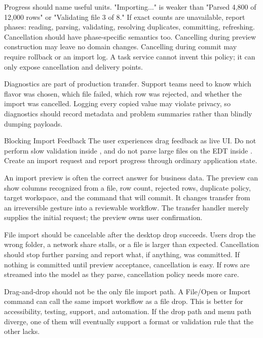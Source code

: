 Progress should name useful units. "Importing..." is weaker than "Parsed 4,800 of 12,000 rows" or "Validating file 3 of 8." If exact counts are unavailable, report phases: reading, parsing, validating, resolving duplicates, committing, refreshing. Cancellation should have phase-specific semantics too. Cancelling during preview construction may leave no domain changes. Cancelling during commit may require rollback or an import log. A task service cannot invent this policy; it can only expose cancellation and delivery points.

Diagnostics are part of production transfer. Support teams need to know which flavor was chosen, which file failed, which row was rejected, and whether the import was cancelled. Logging every copied value may violate privacy, so diagnostics should record metadata and problem summaries rather than blindly dumping payloads.

\begin{pitfallbox}{Blocking Import Feedback}
The user experiences drag feedback as live UI. Do not perform slow validation inside , and do not parse large files on the EDT inside . Create an import request and report progress through ordinary application state.
\end{pitfallbox}

An import preview is often the correct answer for business data. The preview can show columns recognized from a file, row count, rejected rows, duplicate policy, target workspace, and the command that will commit. It changes transfer from an irreversible gesture into a reviewable workflow. The transfer handler merely supplies the initial request; the preview owns user confirmation.

File import should be cancelable after the desktop drop succeeds. Users drop the wrong folder, a network share stalls, or a file is larger than expected. Cancellation should stop further parsing and report what, if anything, was committed. If nothing is committed until preview acceptance, cancellation is easy. If rows are streamed into the model as they parse, cancellation policy needs more care.

Drag-and-drop should not be the only file import path. A File/Open or Import command can call the same import workflow as a file drop. This is better for accessibility, testing, support, and automation. If the drop path and menu path diverge, one of them will eventually support a format or validation rule that the other lacks.

